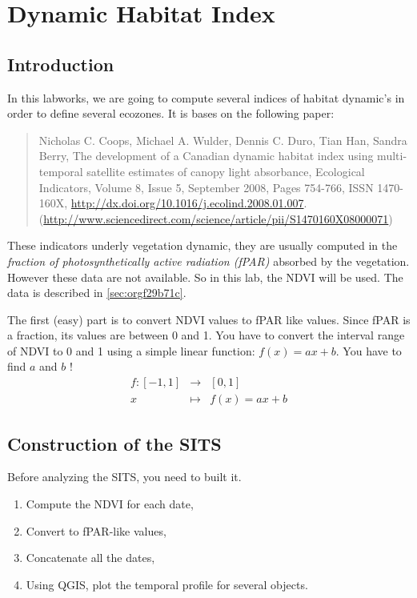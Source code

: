 \documentclass[a4paper,11pt,DIV=18]{scrartcl}
\begin{document}
\section{Dynamic Habitat Index}
\label{sec:org5d4d6d7}
\subsection{Introduction}
\label{sec:org91ccce3}
In this labworks, we are going to compute several indices of habitat
dynamic's in order to define several ecozones. It is bases on the
following paper: 

\begin{quote}
Nicholas C. Coops, Michael A. Wulder, Dennis C. Duro, Tian Han, Sandra
Berry,  The development  of  a Canadian  dynamic  habitat index  using
multi-temporal  satellite   estimates  of  canopy   light  absorbance,
Ecological  Indicators,  Volume  8,  Issue 5,  September  2008,  Pages
754-766,                        ISSN                        1470-160X,
\url{http://dx.doi.org/10.1016/j.ecolind.2008.01.007}.
(\url{http://www.sciencedirect.com/science/article/pii/S1470160X08000071})
\end{quote}

These indicators underly vegetation dynamic, they are usually computed
in the \emph{fraction of photosynthetically active radiation (fPAR)} absorbed
by the vegetation.  However these data  are not available.  So in this
lab, the NDVI will be used. The data is described in \ref{sec:orgf29b71c}.


\begin{work}
The first (easy)  part is to convert NDVI values  to fPAR like values.
Since fPAR is a fraction, its values  are between 0 and 1. You have to
convert the interval  range of NDVI to  0 and 1 using  a simple linear
function: \(f(x)=ax+b\). You have to find \(a\) and \(b\) !
\begin{eqnarray*}
  f:[-1,1] &\to& [0,1]\\
  x&\mapsto&f(x)=ax+b
\end{eqnarray*}
\end{work}

\subsection{Construction of the SITS}
\label{sec:org2e2cd6e}
Before analyzing the  SITS, you need to built it.   
\begin{work}
\begin{enumerate}
\item Compute the NDVI for each date,
\item Convert to fPAR-like values,
\item Concatenate all the dates,
\item Using QGIS,  plot the  temporal  profile for  several objects.
\end{enumerate}
\end{work}
\end{document}
